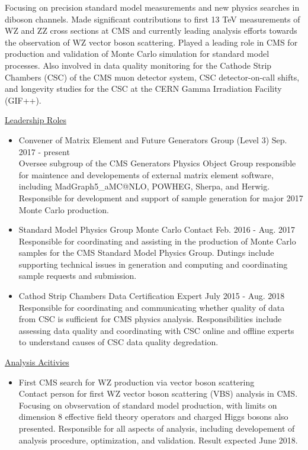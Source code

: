 \documentclass[10pt]{res} %
\begin{document}
\begin{resume}
Focusing on precision standard model measurements and new physics searches in 
diboson channels. Made significant contributions to first 13 TeV measurements of 
WZ and ZZ cross sections at CMS and currently leading analysis efforts 
towards the observation of WZ vector boson scattering. 
Played a leading role in CMS for production and validation of
Monte Carlo simulation for standard model processes.
Also involved in data quality monitoring for the Cathode Strip 
Chambers (CSC) of the CMS muon detector system, CSC detector-on-call shifts, and longevity studies for the CSC at the CERN 
  Gamma Irradiation Facility (GIF++).

\underline{Leadership Roles}
\vspace{2mm}
\begin{itemize}
  \item{Convener of Matrix Element and Future Generators Group (Level 3) \hfill{Sep. 2017 - present}} \\
    Oversee subgroup of the CMS Generators Physics Object Group 
    responsible for maintence and developements of external matrix element software, 
    including MadGraph5\_aMC@NLO, POWHEG, Sherpa, and Herwig. Responsible for development and support of sample generation for
    major 2017 Monte Carlo production.
  \item{Standard Model Physics Group Monte Carlo Contact \hfill{Feb. 2016 - Aug. 2017}} \\
    Responsible for coordinating and assisting 
    in the production of Monte Carlo samples for the CMS Standard Model Physics Group. Dutings include supporting technical issues
    in generation and computing and coordinating sample requests and submission.
  \item{Cathod Strip Chambers Data Certification Expert \hfill{July 2015 - Aug. 2018}} \\
    Responsible for coordinating and communicating
    whether quality of data from CSC is sufficient for CMS physics analysis.
    Responsibilities include assessing data quality and coordinating with CSC online and offline experts to understand
    causes of CSC data quality degredation.
\end{itemize}

\underline{Analysis Acitivies}
\vspace{2mm}
\begin{itemize}
  \item{First CMS search for WZ production via vector boson scattering}\\
    Contact person for first WZ vector boson scattering (VBS) analysis in CMS. 
    Focusing on obvservation of standard model production, with limits on dimension 8 
    effective field theory operators and
    charged Higgs bosons also presented.
    Responsible for all aspects of analysis, 
    including developement of analysis procedure, optimization, and validation. 
    Result expected June 2018.


\end{itemize}
\end{resume}
\end{document}
